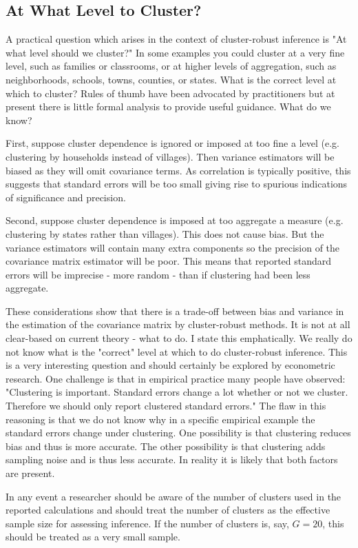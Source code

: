\documentclass[10pt]{article}
\begin{document}
\subsection{At What Level to Cluster?}
A practical question which arises in the context of cluster-robust inference is "At what level should we cluster?" In some examples you could cluster at a very fine level, such as families or classrooms, or at higher levels of aggregation, such as neighborhoods, schools, towns, counties, or states. What is the correct level at which to cluster? Rules of thumb have been advocated by practitioners but at present there is little formal analysis to provide useful guidance. What do we know?

First, suppose cluster dependence is ignored or imposed at too fine a level (e.g. clustering by households instead of villages). Then variance estimators will be biased as they will omit covariance terms. As correlation is typically positive, this suggests that standard errors will be too small giving rise to spurious indications of significance and precision.

Second, suppose cluster dependence is imposed at too aggregate a measure (e.g. clustering by states rather than villages). This does not cause bias. But the variance estimators will contain many extra components so the precision of the covariance matrix estimator will be poor. This means that reported standard errors will be imprecise - more random - than if clustering had been less aggregate.

These considerations show that there is a trade-off between bias and variance in the estimation of the covariance matrix by cluster-robust methods. It is not at all clear-based on current theory - what to do. I state this emphatically. We really do not know what is the "correct" level at which to do cluster-robust inference. This is a very interesting question and should certainly be explored by econometric research. One challenge is that in empirical practice many people have observed: "Clustering is important. Standard errors change a lot whether or not we cluster. Therefore we should only report clustered standard errors." The flaw in this reasoning is that we do not know why in a specific empirical example the standard errors change under clustering. One possibility is that clustering reduces bias and thus is more accurate. The other possibility is that clustering adds sampling noise and is thus less accurate. In reality it is likely that both factors are present.

In any event a researcher should be aware of the number of clusters used in the reported calculations and should treat the number of clusters as the effective sample size for assessing inference. If the number of clusters is, say, $G=20$, this should be treated as a very small sample.
\end{document}
